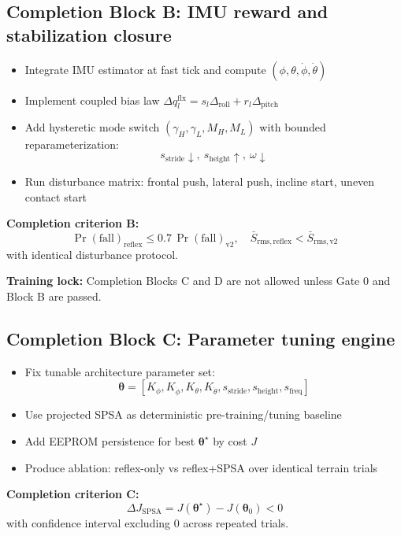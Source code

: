\documentclass[11pt]{article}
\begin{document}
\subsection*{Completion Block B: IMU reward and stabilization closure}
\begin{itemize}
    \item Integrate IMU estimator at fast tick and compute $(\phi,\theta,\dot{\phi},\dot{\theta})$
    \item Implement coupled bias law $\Delta q^{\mathrm{flx}}_{l}=s_l\Delta_{\mathrm{roll}}+r_l\Delta_{\mathrm{pitch}}$
    \item Add hysteretic mode switch $(\gamma_H,\gamma_L,M_H,M_L)$ with bounded reparameterization:
    \[
    s_{\mathrm{stride}}\!\downarrow,\ s_{\mathrm{height}}\!\uparrow,\ \omega\!\downarrow
    \]
    \item Run disturbance matrix: frontal push, lateral push, incline start, uneven contact start
\end{itemize}
\textbf{Completion criterion B:}
\[
\Pr(\mathrm{fall})_{\mathrm{reflex}} \le 0.7\,\Pr(\mathrm{fall})_{\mathrm{v2}},\quad
\bar{S}_{\mathrm{rms,reflex}}<\bar{S}_{\mathrm{rms,v2}}
\]
with identical disturbance protocol.

\textbf{Training lock:} Completion Blocks C and D are not allowed unless Gate 0 and Block B are passed.

\subsection*{Completion Block C: Parameter tuning engine}
\begin{itemize}
    \item Fix tunable architecture parameter set:
    \[
    \boldsymbol{\theta}=[K_{\phi},K_{\dot{\phi}},K_{\theta},K_{\dot{\theta}},s_{\mathrm{stride}},s_{\mathrm{height}},s_{\mathrm{freq}}]
    \]
    \item Use projected SPSA as deterministic pre-training/tuning baseline
    \item Add EEPROM persistence for best $\boldsymbol{\theta}^{\star}$ by cost $J$
    \item Produce ablation: reflex-only vs reflex+SPSA over identical terrain trials
\end{itemize}
\textbf{Completion criterion C:}
\[
\Delta J_{\mathrm{SPSA}} = J(\boldsymbol{\theta}^{\star})-J(\boldsymbol{\theta}_0) < 0
\]
with confidence interval excluding $0$ across repeated trials.
\end{document}
